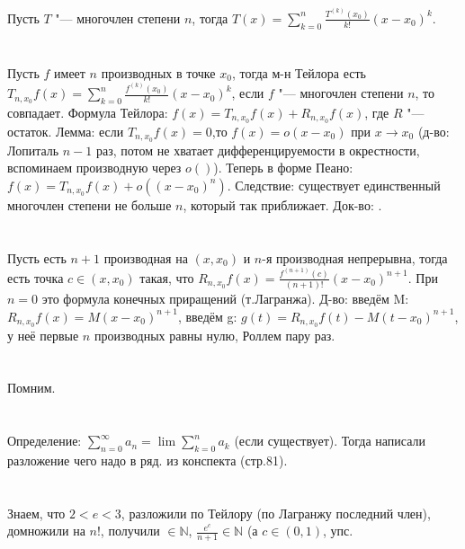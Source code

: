 \section{} %
Пусть $T$ "--- многочлен степени $n$, тогда $T(x)=\sum\limits_{k=0}^n \frac{T^{(k)}(x_0)}{k!}(x-x_0)^k$.

\section{} %
Пусть $f$ имеет $n$ производных в точке $x_0$, тогда м-н Тейлора есть
$T_{n,x_0} f(x) = \sum\limits_{k=0}^n\frac{f^{(k)}(x_0)}{k!}(x-x_0)^k$,
если $f$ "--- многочлен степени $n$, то совпадает.
Формула Тейлора: $f(x) = T_{n,x_0}f(x) + R_{n,x_0} f(x)$, где $R$ "--- остаток.
Лемма: если $T_{n,x_0}f(x) = 0$,то $f(x)=o(x-x_0)$ при $x\to x_0$ (д-во: Лопиталь $n-1$ раз,
потом не хватает дифференцируемости в окрестности, вспоминаем производную через $o()$). Теперь в форме Пеано:
$f(x) = T_{n,x_0}f(x) + o((x-x_0)^n)$. Следствие: существует единственный многочлен степени не больше
$n$, который так приближает. Док-во: \TODO. %

\section{} %
Пусть есть $n+1$ производная на $(x,x_0)$ и $n$-я производная непрерывна,
тогда есть точка $c \in (x,x_0)$ такая, что $R_{n,x_0}f(x) = \frac{f^{(n+1)}(c)}{(n+1)!}(x-x_0)^{n+1}$.
При $n=0$ это формула конечных приращений (т.Лагранжа). Д-во: введём M: $R_{n,x_0}f(x)=M(x-x_0)^{n+1}$,
введём g: $g(t)=R_{n,x_0}f(t)-M(t-x_0)^{n+1}$, у неё первые $n$ производных равны нулю, Роллем пару раз.

\section{} %
Помним.

\section{} %
Определение: $\sum\limits_{n=0}^{\infty} a_n = \lim \sum\limits_{k=0}^n a_k$ (если существует).
Тогда написали разложение чего надо в ряд. \TODO из конспекта (стр.81).

\section{} %
Знаем, что $2 < e < 3$, разложили по Тейлору (по Лагранжу последний член), домножили на $n!$,
получили $\in \mathbb{N}$, $\frac{e^c}{n+1} \in \mathbb{N}$ (а $c \in (0,1)$, упс.

